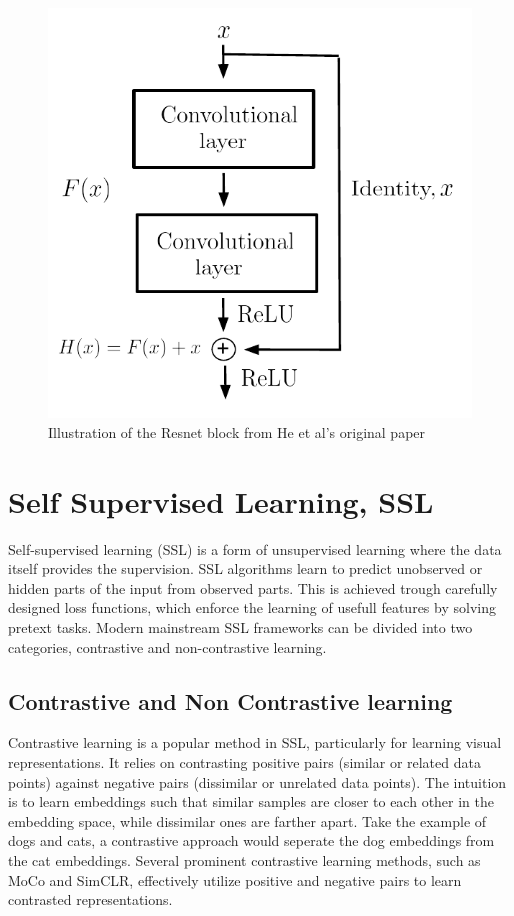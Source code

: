 \begin{figure}[H]
    \includegraphics[scale=0.6]{figures/figure-pdf/Resnet.pdf}
    \caption{Illustration of the Resnet block from He et al's original paper\cite{ResLearn} }
    \label{fig:resblock}
\end{figure}

\section{Self Supervised Learning, SSL}
Self-supervised learning (SSL) is a form of unsupervised learning where the data itself provides the supervision. SSL algorithms learn to predict unobserved or hidden parts of the input from observed parts.
This is achieved trough carefully designed loss functions, which enforce the learning of usefull features by solving pretext tasks. Modern mainstream SSL frameworks can be divided into two categories, contrastive and non-contrastive learning.

\subsection{Contrastive and Non Contrastive learning}
Contrastive learning is a popular method in SSL, particularly for learning visual representations. It relies on contrasting positive pairs (similar or related data points) against negative pairs (dissimilar or unrelated data points). 
The intuition is to learn embeddings such that similar samples are closer to each other in the embedding space, while dissimilar ones are farther apart. Take the example of dogs and cats,
a contrastive approach would seperate the dog embeddings from the cat embeddings. Several prominent contrastive learning methods, such as MoCo\cite{MoCo} and SimCLR\cite{SimCLR}, effectively utilize positive and negative pairs to learn contrasted representations.

